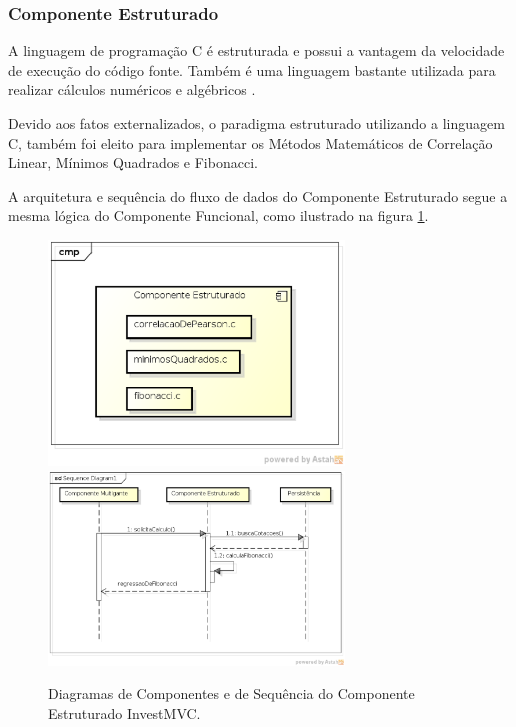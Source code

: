 \subsubsection{Componente Estruturado}

A linguagem de programação C é estruturada e possui a vantagem da velocidade de execução do código fonte. Também é uma linguagem bastante utilizada para realizar cálculos numéricos e algébricos \cite{gustavo}. 

Devido aos fatos externalizados, o paradigma estruturado utilizando a linguagem C, também foi eleito para implementar os Métodos Matemáticos de Correlação Linear, Mínimos Quadrados e Fibonacci.

A arquitetura e sequência do fluxo de dados do Componente Estruturado segue a mesma lógica do Componente Funcional, como ilustrado na figura \ref{sequenciaEstruturado}.

\begin{figure}[H]
\centering
\includegraphics[width=0.7\textwidth]{figuras/componenteEstruturado}
\includegraphics[width=0.7\textwidth]{figuras/sequenciaEstruturado}
\caption{Diagramas de Componentes e de Sequência do Componente Estruturado InvestMVC.}
\label{sequenciaEstruturado}
\end{figure}

